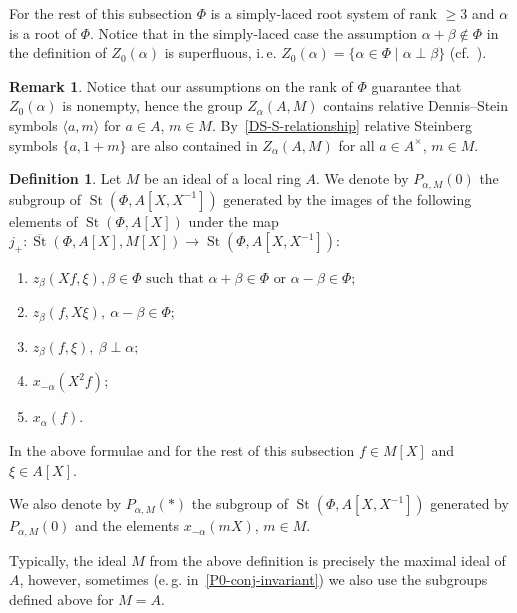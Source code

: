 \documentclass[oneside, 8pt]{amsart}
\theoremstyle{remark}
\theoremstyle{definition}
\numberwithin{lemma}{section}
\numberwithin{prop}{section}
\numberwithin{corollary}{section}
\newtheorem{df}[lemma]{Definition} \Crefname{df}{Definition}{Definitions}
\newtheorem{rem}[lemma]{Remark}
\DeclareMathOperator{\St}{St}
\numberwithin{equation}{section}
\begin{document}
For the rest of this subsection $\Phi$ is a simply-laced root system of rank $\geq 3$ and $\alpha$ is a root of $\Phi$. Notice that in the simply-laced case the assumption $\alpha+\beta\not\in \Phi$ in the definition of $Z_0(\alpha)$ is superfluous, i.\,e. $Z_0(\alpha) = \{ \alpha\in\Phi \mid \alpha \perp \beta \}$
(cf.~\cite[Proposition~5.7]{St71}).

\begin{rem}\label{Z-DS} Notice that our assumptions on the rank of $\Phi$ guarantee that $Z_0(\alpha)$ is nonempty, hence the group $Z_\alpha(A, M)$ contains relative Dennis--Stein symbols $\langle a, m \rangle$ for $a\in A$, $m\in M$.
By~\eqref{DS-S-relationship} relative Steinberg symbols $\{a, 1+m\}$ are also contained in $Z_\alpha(A, M)$ for all $a\in A^\times$, $m\in M$. \end{rem}

\begin{df} \label{defP0}
Let $M$ be an ideal of a local ring $A$. We denote by $P_{\alpha, M}(0)$ the subgroup of $\St(\Phi, A[X, X^{-1}])$ generated by the images of the following elements of $\St(\Phi, A[X])$ under the
 map $j_+ \colon \overline{\St}(\Phi, A[X], M[X]) \to \St(\Phi, A[X, X^{-1}])$:
\begin{enumerate} \item $z_{\beta}(Xf, \xi), \beta \in \Phi \text{ such that }\alpha + \beta \in \Phi\text{ or } \alpha - \beta \in \Phi;$
 \item $z_{\beta}(f, X\xi),\ \alpha - \beta \in \Phi;$
 \item $z_{\beta}(f, \xi),\ \beta \perp \alpha;$
 \item $x_{-\alpha}(X^2f);$
 \item $x_{\alpha}(f)$. \end{enumerate}
In the above formulae and for the rest of this subsection $f \in M[X]$ and $\xi \in A[X]$. 

We also denote by $P_{\alpha, M}(*)$ the subgroup of $\St(\Phi, A[X, X^{-1}])$ generated by $P_{\alpha, M}(0)$ and the elements $x_{-\alpha}(mX)$, $m \in M$.
\end{df}

Typically, the ideal $M$ from the above definition is precisely the maximal ideal of $A$, however, sometimes (e.\,g. in~\cref{P0-conj-invariant}) we also use the subgroups defined above for $M=A$.
\end{document}
